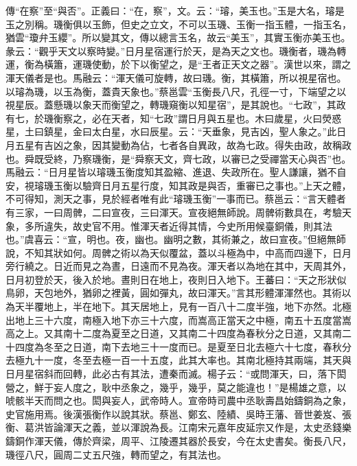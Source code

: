 {\noindent\zhuan{}\fzbyks 傳“在察”至“與否”。正義曰：“在，察”，文。云：“璿，美玉也。”玉是大名，璿是玉之別稱。璣衡俱以玉飾，但史之立文，不可以玉璣、玉衡一指玉體，一指玉名，猶雲“瓊弁玉纓”。所以變其文，傳以總言玉名，故云“美玉”，其實玉衡亦美玉也。彖云：“觀乎天文以察時變。”日月星宿運行於天，是為天之文也。璣衡者，璣為轉運，衡為橫簫，運璣使動，於下以衡望之，是“王者正天文之器”。漢世以來，謂之渾天儀者是也。馬融云：“渾天儀可旋轉，故曰璣。衡，其橫簫，所以視星宿也。以璿為璣，以玉為衡，蓋貴天象也。”蔡邕雲“玉衡長八尺，孔徑一寸，下端望之以視星辰。蓋懸璣以象天而衡望之，轉璣窺衡以知星宿”，是其說也。“七政”，其政有七，於璣衡察之，必在天者，知“七政”謂日月與五星也。木曰歲星，火曰熒惑星，土曰鎮星，金曰太白星，水曰辰星。云：“天垂象，見吉凶，聖人象之。”此日月五星有吉凶之象，因其變動為佔，七者各自異政，故為七政。得失由政，故稱政也。舜既受終，乃察璣衡，是“舜察天文，齊七政，以審已之受禪當天心與否”也。馬融云：“日月星皆以璿璣玉衡度知其盈縮、進退、失政所在。聖人謙讓，猶不自安，視璿璣玉衡以驗齊日月五星行度，知其政是與否，重審已之事也。”上天之體，不可得知，測天之事，見於經者唯有此“璿璣玉衡”一事而已。蔡邕云：“言天體者有三家，一曰周髀，二曰宣夜，三曰渾天。宣夜絕無師說。周髀術數具在，考驗天象，多所違失，故史官不用。惟渾天者近得其情，今史所用候臺銅儀，則其法也。”虞喜云：“宣，明也。夜，幽也。幽明之數，其術兼之，故曰宣夜。”但絕無師說，不知其狀如何。周髀之術以為天似覆盆，蓋以斗極為中，中高而四邊下，日月旁行繞之。日近而見之為晝，日遠而不見為夜。渾天者以為地在其中，天周其外，日月初登於天，後入於地。晝則日在地上，夜則日入地下。王蕃曰：“天之形狀似鳥卵，天包地外，猶卵之裡黃，圓如彈丸，故曰渾天。”言其形體渾渾然也。其術以為天半覆地上，半在地下。其天居地上，見有一百八十二度半強，地下亦然。北極出地上三十六度，南極入地下亦三十六度，而嵩高正當天之中極，南五十五度當嵩高之上。又其南十二度為夏至之日道，又其南二十四度為春秋分之日道，又其南二十四度為冬至之日道，南下去地三十一度而已。是夏至日北去極六十七度，春秋分去極九十一度，冬至去極一百一十五度，此其大率也。其南北極持其兩端，其天與日月星宿斜而回轉，此必古有其法，遭秦而滅。楊子云：“或問渾天，曰，落下閎營之，鮮于妄人度之，耿中丞象之，幾乎，幾乎，莫之能違也！”是楊雄之意，以唬骸半天而問之也。閎與妄人，武帝時人。宣帝時司農中丞耿壽昌始鑄銅為之象，史官施用焉。後漢張衡作以說其狀。蔡邕、鄭玄、陸績、吳時王藩、晉世姜岌、張衡、葛洪皆論渾天之義，並以渾說為長。江南宋元嘉年皮延宗又作是，太史丞錢樂鑄銅作渾天儀，傳於齊梁，周平、江陵遷其器於長安，今在太史書矣。衡長八尺，璣徑八尺，圓周二丈五尺強，轉而望之，有其法也。 \par}

